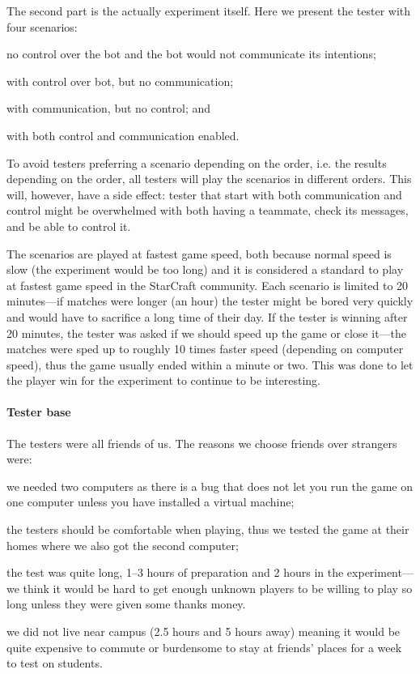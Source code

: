 The second part is the actually experiment itself. Here we present the tester with four scenarios:
\begin{inparaenum}[1\upshape)]
	\item no control over the bot and the bot would not communicate its intentions;
	\item with control over bot, but no communication;
	\item with communication, but no control; and
	\item with both control and communication enabled.
\end{inparaenum}
To avoid testers preferring a scenario depending on the order, i.e. the results depending on the
order, all testers will play the scenarios in different orders. This will, however, have a side effect:
tester that start with both communication and control might be overwhelmed with both having a
teammate, check its messages, and be able to control it.

The scenarios are played at fastest game speed, both because normal speed is slow (the experiment
would be too long) and it is considered a standard to play at fastest game speed in the StarCraft
community. Each scenario is limited to 20 minutes—if matches were longer (an hour) the tester might
be bored very quickly and would have to sacrifice a long time of their day. If the tester is winning
after 20 minutes, the tester was asked if we should speed up the game or close it—the matches were
sped up to roughly 10 times faster speed (depending on computer speed), thus the game usually ended
within a minute or two. This was done to let the player win for the experiment to continue to be
interesting.

\paragraph{Tester base}
The testers were all friends of us. The reasons we choose friends over strangers were:
\begin{inparaenum}[1\upshape)]
	\item we needed two computers as there is a bug that does not let you run the game on one computer
		unless you have installed a virtual machine;
	\item the testers should be comfortable when playing, thus we tested the game at their homes where
		we also got the second computer;
	\item the test was quite long, 1–3 hours of preparation and 2 hours in the experiment—we think it
		would be hard to get enough unknown players to be willing to play so long unless they were given
		some thanks money.
	\item we did not live near campus (2.5 hours and 5 hours away) meaning it would be quite expensive
		to commute or burdensome to stay at friends' places for a week to test on students.
\end{inparaenum}

